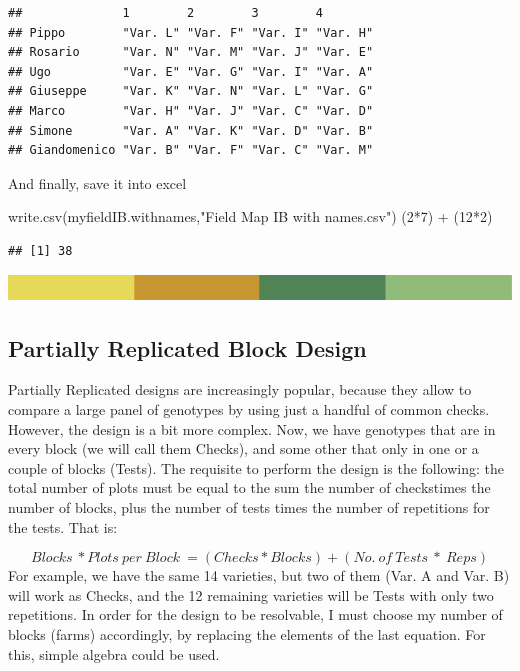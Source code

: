 \documentclass[
]{book}
\newenvironment{Shaded}{\begin{snugshade}}{\end{snugshade}}
\newcommand{\DecValTok}[1]{\textcolor[rgb]{0.00,0.00,0.81}{#1}}
\newcommand{\FunctionTok}[1]{\textcolor[rgb]{0.00,0.00,0.00}{#1}}
\newcommand{\NormalTok}[1]{#1}
\newcommand{\SpecialCharTok}[1]{\textcolor[rgb]{0.00,0.00,0.00}{#1}}
\newcommand{\StringTok}[1]{\textcolor[rgb]{0.31,0.60,0.02}{#1}}
\begin{document}
\begin{verbatim}
##              1        2        3        4       
## Pippo        "Var. L" "Var. F" "Var. I" "Var. H"
## Rosario      "Var. N" "Var. M" "Var. J" "Var. E"
## Ugo          "Var. E" "Var. G" "Var. I" "Var. A"
## Giuseppe     "Var. K" "Var. N" "Var. L" "Var. G"
## Marco        "Var. H" "Var. J" "Var. C" "Var. D"
## Simone       "Var. A" "Var. K" "Var. D" "Var. B"
## Giandomenico "Var. B" "Var. F" "Var. C" "Var. M"
\end{verbatim}

And finally, save it into excel

\begin{Shaded}
\begin{Highlighting}[]
\FunctionTok{write.csv}\NormalTok{(myfieldIB.withnames,}\StringTok{"Field Map IB with names.csv"}\NormalTok{)}
\NormalTok{(}\DecValTok{2}\SpecialCharTok{*}\DecValTok{7}\NormalTok{) }\SpecialCharTok{+}\NormalTok{ (}\DecValTok{12}\SpecialCharTok{*}\DecValTok{2}\NormalTok{)}
\end{Highlighting}
\end{Shaded}

\begin{verbatim}
## [1] 38
\end{verbatim}

\includegraphics{rsrstrip.png}

\hypertarget{partially-replicated-block-design}{%
\subsection{Partially Replicated Block Design}\label{partially-replicated-block-design}}

Partially Replicated designs are increasingly popular, because they allow to compare a large panel of genotypes by using just a handful of common checks. However, the design is a bit more complex. Now, we have genotypes that are in every block (we will call them Checks), and some other that only in one or a couple of blocks (Tests). The requisite to perform the design is the following: the total number of plots must be equal to the sum the number of checkstimes the number of blocks, plus the number of tests times the number of repetitions for the tests. That is:

\[
  Blocks\ * Plots\ per\  Block\ =  ( Checks * Blocks) +  (No.\ of\  Tests\ *\  Reps)
\]
For example, we have the same 14 varieties, but two of them (Var. A and Var. B) will work as Checks, and the 12 remaining varieties will be Tests with only two repetitions. In order for the design to be resolvable, I must choose my number of blocks (farms) accordingly, by replacing the elements of the last equation. For this, simple algebra could be used.
\end{document}
